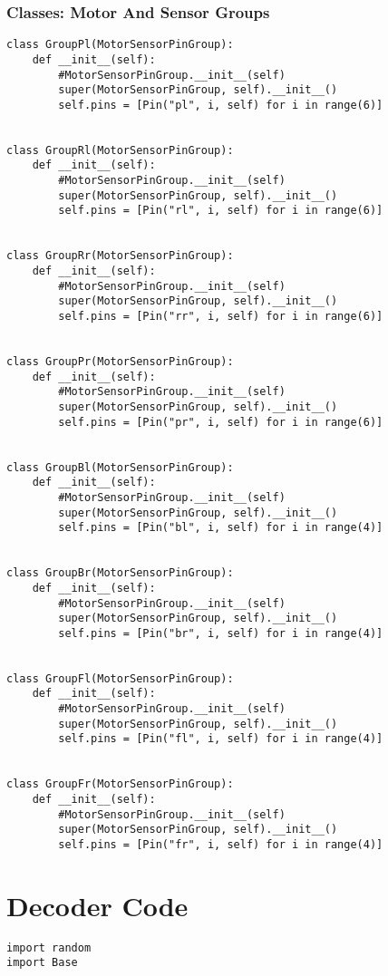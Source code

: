 \documentclass[a4paper]{article}
\begin{document}
\subsubsection{Classes: Motor And Sensor Groups}
\label{sec-4-5-7}
\begin{verbatim}
class GroupPl(MotorSensorPinGroup):
    def __init__(self):
        #MotorSensorPinGroup.__init__(self)
        super(MotorSensorPinGroup, self).__init__()
        self.pins = [Pin("pl", i, self) for i in range(6)]


class GroupRl(MotorSensorPinGroup):
    def __init__(self):
        #MotorSensorPinGroup.__init__(self)
        super(MotorSensorPinGroup, self).__init__()
        self.pins = [Pin("rl", i, self) for i in range(6)]


class GroupRr(MotorSensorPinGroup):
    def __init__(self):
        #MotorSensorPinGroup.__init__(self)
        super(MotorSensorPinGroup, self).__init__()
        self.pins = [Pin("rr", i, self) for i in range(6)]


class GroupPr(MotorSensorPinGroup):
    def __init__(self):
        #MotorSensorPinGroup.__init__(self)
        super(MotorSensorPinGroup, self).__init__()
        self.pins = [Pin("pr", i, self) for i in range(6)]


class GroupBl(MotorSensorPinGroup):
    def __init__(self):
        #MotorSensorPinGroup.__init__(self)
        super(MotorSensorPinGroup, self).__init__()
        self.pins = [Pin("bl", i, self) for i in range(4)]


class GroupBr(MotorSensorPinGroup):
    def __init__(self):
        #MotorSensorPinGroup.__init__(self)
        super(MotorSensorPinGroup, self).__init__()
        self.pins = [Pin("br", i, self) for i in range(4)]


class GroupFl(MotorSensorPinGroup):
    def __init__(self):
        #MotorSensorPinGroup.__init__(self)
        super(MotorSensorPinGroup, self).__init__()
        self.pins = [Pin("fl", i, self) for i in range(4)]


class GroupFr(MotorSensorPinGroup):
    def __init__(self):
        #MotorSensorPinGroup.__init__(self)
        super(MotorSensorPinGroup, self).__init__()
        self.pins = [Pin("fr", i, self) for i in range(4)]
\end{verbatim}

\section{Decoder Code}
\label{sec-5}
\begin{verbatim}
import random
import Base
\end{verbatim}
\end{document}
